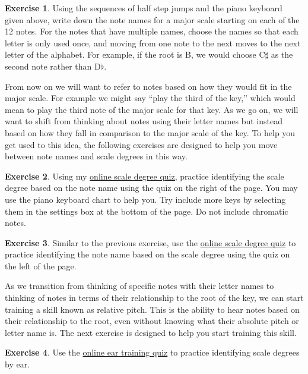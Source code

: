 \documentclass[12pt]{article}
\theoremstyle{definition}
\newtheorem{exercise}{Exercise}
\begin{document}
\begin{exercise} \label{ex:writeScales}
Using the sequences of half step jumps and the piano keyboard given above, write down the note names for a major scale starting on each of the 12 notes. For the notes that have multiple names, choose the names so that each letter is only used once, and moving from one note to the next moves to the next letter of the alphabet. For example, if the root is B, we would choose C$\sharp$ as the second note rather than D$\flat$. 
\end{exercise}

From now on we will want to refer to notes based on how they would fit in the major scale. 
For example we might say ``play the third of the key,'' which would mean to play the third note of the major scale for that key. 
As we go on, we will want to shift from thinking about notes using their letter names but instead based on how they fall in comparison to the major scale of the key. 
To help you get used to this idea, the following exercises are designed to help you move between note names and scale degrees in this way.

\begin{exercise}
Using my \href{https://ahballif.github.io/AddisonGuitarResources/scale_degree_keys.html}{online scale degree quiz,} practice identifying the scale degree based on the note name using the quiz on the right of the page. You may use the piano keyboard chart to help you. Try include more keys by selecting them in the settings box at the bottom of the page. Do not include chromatic notes. 
\end{exercise}

\begin{exercise}
Similar to the previous exercise, use the \href{https://ahballif.github.io/AddisonGuitarResources/scale_degree_keys.html}{online scale degree quiz} to practice identifying the note name based on the scale degree using the quiz on the left of the page. 
\end{exercise}

As we transition from thinking of specific notes with their letter names to thinking of notes in terms of their relationship to the root of the key, we can start training a skill known as relative pitch. This is the ability to hear notes based on their relationship to the root, even without knowing what their absolute pitch or letter name is. The next exercise is designed to help you start training this skill. 

\begin{exercise}
Use the \href{https://ahballif.github.io/AddisonGuitarResources/scale_degree_ear_quiz.html}{online ear training quiz} to practice identifying scale degrees by ear.
\end{exercise}
\end{document}
